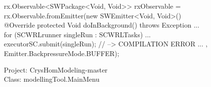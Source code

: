 \begin{figure}[H]
\begin{sourcecode}
\begin{javacode}{7}
rx.Observable<SWPackage<Void, Void>> rxObservable = rx.Observable.fromEmitter(new SWEmitter<Void, Void>(){
	@Override
	protected Void doInBackground() throws Exception {
		...
					for (SCWRLrunner singleRun : SCWRLTasks) {
						...
						executorSC.submit(singleRun); // --> COMPILATION ERROR
					}
		...
	}
}, Emitter.BackpressureMode.BUFFER);
\end{javacode}
\caption{Project: CrysHomModeling-master\\ Class: modellingTool.MainMenu}
\label{code:nested-swingworkers}
\end{sourcecode}
\end{figure}
